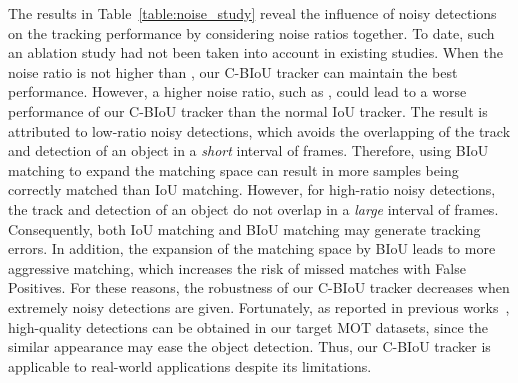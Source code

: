 \documentclass[journal]{IEEEtran}
\begin{document}
The results in Table~\ref{table:noise_study} reveal the influence of noisy detections on the tracking performance by considering noise ratios together. To date, such an ablation study had not been taken into account in existing studies. When the noise ratio is not higher than , our C-BIoU tracker can maintain the best performance. However, a higher noise ratio, such as , could lead to a worse performance of our C-BIoU tracker than the normal IoU tracker. The result is attributed to low-ratio noisy detections, which avoids the overlapping of the track and detection of an object in a \textit{short} interval of frames. Therefore, using BIoU matching to expand the matching space can result in more samples being correctly matched than IoU matching. However, for high-ratio noisy detections, the track and detection of an object do not overlap in a \textit{large} interval of frames. Consequently, both IoU matching and BIoU matching may generate tracking errors. In addition, the expansion of the matching space by BIoU leads to more aggressive matching, which increases the risk of missed matches with  False Positives. For these reasons, the robustness of our C-BIoU tracker decreases when extremely noisy detections are given. Fortunately, as reported in previous works~\cite{sun2022dancetrack, cioppa2022soccernet, bai2021gmot}, high-quality detections can be obtained in our target MOT datasets, since the similar appearance may ease the object detection. Thus, our C-BIoU tracker is applicable to real-world applications despite its limitations.
\end{document}
